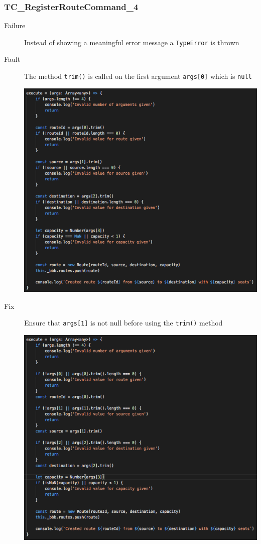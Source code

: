 \documentclass[11pt]{article}
\begin{document}
\begin{description}
\begin{center}
\end{center}
\end{description}

\subsubsection{TC\_RegisterRouteCommand\_4}
\label{sec:org14e40ad}

\begin{description}
\item[{Failure}] Instead of showing a meaningful error message a \texttt{TypeError} is thrown
\item[{Fault}] The method \texttt{trim()} is called on the first argument \texttt{args[0]} which is \texttt{null}
\begin{center}
\includegraphics[width=.9\linewidth]{./Iteration3.rtfd/Pasted Graphic 7.tiff.png}
\end{center}
\item[{Fix}] Ensure that \texttt{args[1]} is not null before using the \texttt{trim()} method
\begin{center}
\includegraphics[width=.9\linewidth]{./Iteration3.rtfd/Pasted Graphic 14.tiff.png}
\end{center}
\end{description}
\end{document}
